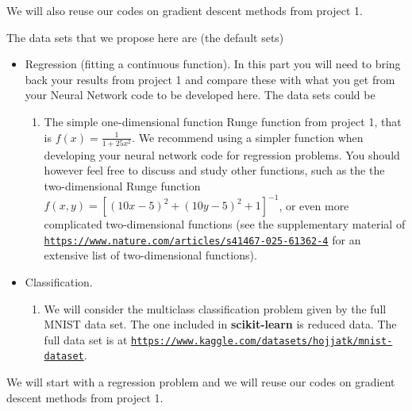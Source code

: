 \documentclass[%
oneside,                 %
final,                   %
10pt]{article}
\begin{document}
We will also reuse our codes on gradient descent methods from project 1.

The data sets that we propose here are (the default sets)

\begin{itemize}
\item Regression (fitting a continuous function). In this part you will need to bring back your results from project 1 and compare these with what you get from your Neural Network code to be developed here. The data sets could be
\begin{enumerate}

 \item The simple one-dimensional function Runge function from project 1, that is $f(x) = \frac{1}{1+25x^2}$. We recommend using a simpler function when developing your neural network code for regression problems. You should however feel free to discuss and study other functions, such as the the two-dimensional Runge function $f(x,y)=\left[(10x - 5)^2 + (10y - 5)^2 + 1 \right]^{-1}$, or even more complicated two-dimensional functions (see the supplementary material of \href{{https://www.nature.com/articles/s41467-025-61362-4}}{\nolinkurl{https://www.nature.com/articles/s41467-025-61362-4}} for an extensive list of two-dimensional functions). 

\end{enumerate}

\noindent
\item Classification.
\begin{enumerate}

 \item We will consider the multiclass classification problem given by the full MNIST data set. The one  included in \textbf{scikit-learn} is  reduced data. The full data set is at \href{{https://www.kaggle.com/datasets/hojjatk/mnist-dataset}}{\nolinkurl{https://www.kaggle.com/datasets/hojjatk/mnist-dataset}}. 
\end{enumerate}

\noindent
\end{itemize}

\noindent
We will start with a regression problem and we will reuse our codes on gradient descent methods from project 1.
\end{document}

